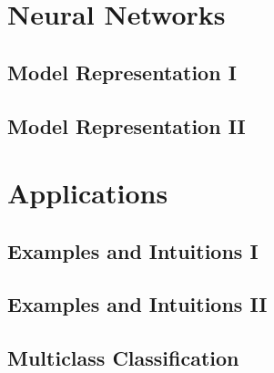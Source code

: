 \documentclass{article}
\begin{document}
\begin{CJK}{UTF8}{gbsn}
\section{Neural Networks}
\subsection{Model Representation I}
\subparagraph{}
\subsection{Model Representation II}
\section{Applications}
\subsection{Examples and Intuitions I}
\subsection{Examples and Intuitions II}
\subsection{Multiclass Classification}

\end{CJK}
\end{document}
